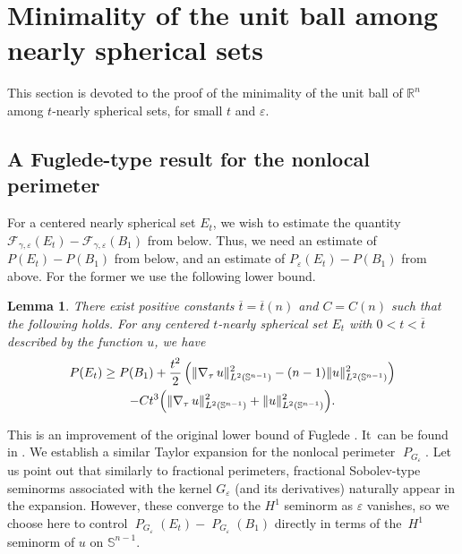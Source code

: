 \documentclass[JEP,XML,SOM,Unicode,published]{cedram}
\numberwithin{equation}{section}
\theoremstyle{plain}
\newtheorem{lem}[thm]{Lemma}
\theoremstyle{definition}
\newcommand{\numberset}[1]{{\mathbb{#1}}}
\newcommand{\R}{\numberset{R}}
\newcommand{\bbS}{\mathbb{S}}
\newcommand{\calF}{{\mathcal{F}}}
\let\eps\varepsilon
\let\ol\overline
\newcommand{\Ren}{{\R^n}}
\newcommand{\grad}{\nabla}
\DeclareMathOperator{\Per}{\mathit{P}}
\DeclarePairedDelimiter{\norm}{\lVert}{\rVert}
\begin{document}
\section{Minimality of the unit ball among nearly spherical sets}\label{sec:fuglede}

This section is devoted to the proof of the minimality of the unit ball of $\Ren$ among $t$-nearly
spherical sets, for small $t$ and $\eps$.

\subsection{A Fuglede-type result for the nonlocal perimeter}

For a centered nearly spherical set $E_t$, we wish to estimate the quantity
$\calF_{\gamma,\eps}(E_t)-\calF_{\gamma,\eps}(B_1)$ from below. Thus, we need an estimate of
$P(E_t)-P(B_1)$ from below, and an estimate of $P_\eps(E_t)-P(B_1)$ from above.
For the former we use the following lower bound.

\begin{lem}\label{lem:fugledeper}
There exist positive constants $\ol{t}=\ol{t}(n)$ and $C=C(n)$ such that the following holds.
For any centered $t$-nearly spherical set $E_t$ with $0<t<\ol{t}$ described by the function $u$, we
have
\begin{multline*}
P(E_t)\geq
P(B_1)+\frac{t^2}{2}\left(\norm{\grad_\tau\,u}_{L^2(\bbS^{n-1})}^2
-(n-1)\norm{u}_{L^2(\bbS^{n-1})}^2\right)\\
-Ct^3\Bigl(\norm{\grad_\tau\, u}_{L^2(\bbS^{n-1})}^2+\norm{u}_{L^2(\bbS^{n-1})}^2 \Bigr).
\end{multline*}
\end{lem}

This is an improvement of the original lower bound of Fuglede \cite[Th.\,1.2]{Fug1989}.
It~can be found in \cite[Proof of Th.\,3.1]{Fus2015}.
We establish a similar Taylor expansion for the nonlocal perimeter $\Per_{G_\eps}$. Let us point out
that similarly to fractional perimeters, fractional Sobolev-type seminorms associated with the
kernel $G_\eps$ (and its derivatives) naturally appear in the expansion. However, these converge to
the $H^1$ seminorm as $\eps$ vanishes, so we choose here to control
$\Per_{G_\eps}(E_t)-\Per_{G_\eps}(B_1)$ directly in terms of the~$H^1$ seminorm of $u$ on
$\bbS^{n-1}$.
\end{document}
